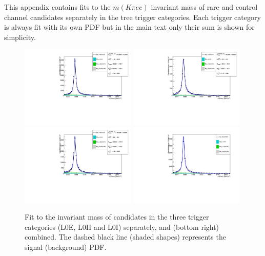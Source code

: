 This appendix contains fits to the $m(K\pi ee )$ invariant mass of rare and control channel
candidates separately in the tree trigger categories. Each trigger category is always fit
with its own PDF but in the main text only their sum is shown for simplicity.

\begin{figure}[h!]
\centering
\includegraphics[width=0.49\textwidth]{RKst/figs/Fit/fit_EE/KstJPsEE_L0E.pdf}
\includegraphics[width=0.49\textwidth]{RKst/figs/Fit/fit_EE/KstJPsEE_L0H.pdf}
\includegraphics[width=0.49\textwidth]{RKst/figs/Fit/fit_EE/KstJPsEE_L0I.pdf}
\includegraphics[width=0.49\textwidth]{RKst/figs/Fit/fit_EE/fit_JPs_L.pdf}
\caption{Fit to the \mKpiee invariant mass of \BdToKstJPsee candidates in the three trigger categories 
(L0E, L0H and L0I) separately, and (bottom right) combined. The dashed black line (shaded shapes) 
represents the signal (background) PDF.}
\label{fig:fitJPs_control_EE}
\end{figure}
